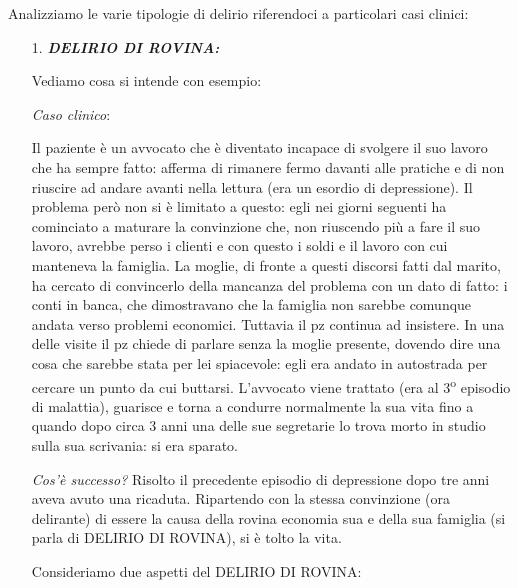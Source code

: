 Analizziamo le varie tipologie di delirio riferendoci a particolari casi
clinici:

\begin{itemize}
\item[1.]
  \textbf{\emph{DELIRIO DI ROVINA:}}

Vediamo cosa si intende con esempio:

\emph{Caso clinico}:

Il paziente è un avvocato che è diventato incapace di svolgere il suo
lavoro che ha sempre fatto: afferma di rimanere fermo davanti alle
pratiche e di non riuscire ad andare avanti nella lettura (era un
esordio di depressione). Il problema però non si è limitato a questo:
egli nei giorni seguenti ha cominciato a maturare la convinzione che,
non riuscendo più a fare il suo lavoro, avrebbe perso i clienti e con
questo i soldi e il lavoro con cui manteneva la famiglia. La moglie, di
fronte a questi discorsi fatti dal marito, ha cercato di convincerlo
della mancanza del problema con un dato di fatto: i conti in banca, che
dimostravano che la famiglia non sarebbe comunque andata verso problemi
economici. Tuttavia il pz continua ad insistere. In una delle visite il
pz chiede di parlare senza la moglie presente, dovendo dire una cosa che
sarebbe stata per lei spiacevole: egli era andato in autostrada per
cercare un punto da cui buttarsi. L'avvocato viene trattato (era al 3\textsuperscript{o}
episodio di malattia), guarisce e torna a condurre normalmente la sua
vita fino a quando dopo circa 3 anni una delle sue segretarie lo trova
morto in studio sulla sua scrivania: si era sparato.

\emph{Cos'è successo?} Risolto il precedente episodio di depressione
dopo tre anni aveva avuto una ricaduta. Ripartendo con la stessa
convinzione (ora delirante) di essere la causa della rovina economia sua
e della sua famiglia (si parla di DELIRIO DI ROVINA), si è tolto la
vita.

Consideriamo due aspetti del DELIRIO DI ROVINA:


\end{itemize}
